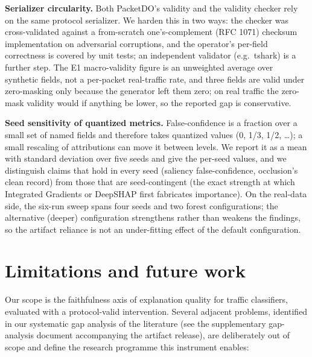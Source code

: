 \documentclass[journal]{IEEEtran}
\begin{document}
\textbf{Serializer circularity.} Both PacketDO's validity and the
validity checker rely on the same protocol serializer. We harden this in
two ways: the checker was cross-validated against a from-scratch
one's-complement (RFC 1071) checksum implementation on adversarial
corruptions, and the operator's per-field correctness is covered by unit
tests; an independent validator (e.g.~tshark) is a further step. The E1
macro-validity figure is an unweighted average over synthetic fields,
not a per-packet real-traffic rate, and three fields are valid under
zero-masking only because the generator left them zero; on real traffic
the zero-mask validity would if anything be lower, so the reported gap
is conservative.

\textbf{Seed sensitivity of quantized metrics.} False-confidence is a
fraction over a small set of named fields and therefore takes quantized
values (0, 1/3, 1/2, \ldots); a small rescaling of attributions can move
it between levels. We report it as a mean with standard deviation over
five seeds and give the per-seed values, and we distinguish claims that
hold in every seed (saliency false-confidence, occlusion's clean record)
from those that are seed-contingent (the exact strength at which
Integrated Gradients or DeepSHAP first fabricates importance). On the
real-data side, the six-run sweep spans four seeds and two forest
configurations; the alternative (deeper) configuration strengthens
rather than weakens the findings, so the artifact reliance is not an
under-fitting effect of the default configuration.

\section{Limitations and future work}

Our scope is the faithfulness axis of explanation quality for traffic
classifiers, evaluated with a protocol-valid intervention. Several
adjacent problems, identified in our systematic gap analysis of the
literature (see the supplementary gap-analysis document accompanying the
artifact release), are deliberately out of scope and define the research
programme this instrument enables:
\end{document}
